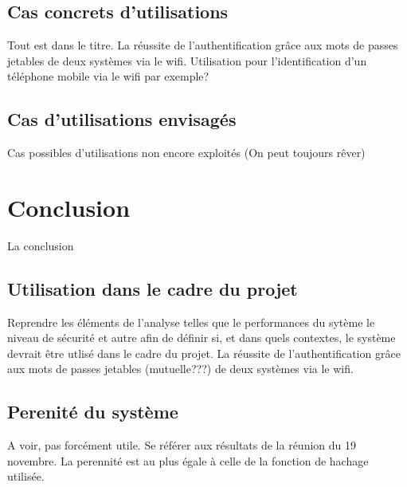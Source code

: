 \documentclass{../res/univ-projet}
\begin{document}
  \subsection{Cas concrets d'utilisations}
  Tout est dans le titre.
  La réussite de l'authentification grâce aux mots de passes jetables de deux systèmes via le wifi.
  Utilisation pour l'identification d'un téléphone mobile via le wifi par exemple?
  
  \subsection{Cas d'utilisations envisagés}
  Cas possibles d'utilisations non encore exploités (On peut toujours r\^ever)
  
\section{Conclusion}
La conclusion
  \subsection{Utilisation dans le cadre du projet}
  Reprendre les éléments de l'analyse telles que le performances du sytème le niveau de sécurité et autre afin de définir si, et dans quels contextes, le système devrait
  \^etre utlisé dans le cadre du projet.
  La réussite de l'authentification grâce aux mots de passes jetables (mutuelle???) de deux systèmes via le wifi.
  
  \subsection{Perenité du système}
  A voir, pas forcément utile. Se référer aux résultats de la réunion du 19 novembre.
  La perennité est au plus égale à celle de la fonction de hachage utilisée.
    
\end{document}
